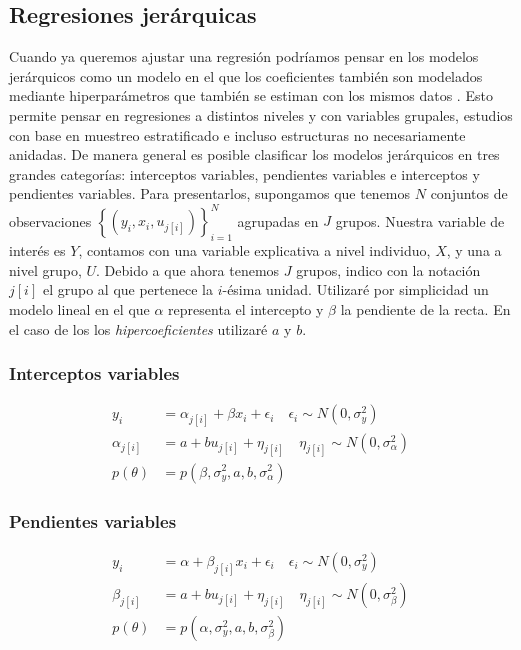 \subsection{Regresiones jerárquicas}

Cuando ya queremos ajustar una regresión podríamos pensar en los modelos jerárquicos como un modelo en el que los coeficientes también son modelados mediante hiperparámetros que también se estiman con los mismos datos \parencite[1]{GelmanHill06}. Esto permite pensar en regresiones a distintos niveles y con variables grupales, estudios con base en muestreo estratificado e incluso estructuras no necesariamente anidadas. De manera general es posible clasificar los modelos jerárquicos en tres grandes categorías: interceptos variables, pendientes variables e interceptos y pendientes variables. Para presentarlos, supongamos que tenemos $N$ conjuntos de observaciones $\left\lbrace(y_i,x_i,u_{j[i]})\right\rbrace_{i=1}^{N}$ agrupadas en $J$ grupos. Nuestra variable de interés es $Y$, contamos con una variable explicativa a nivel individuo, $X$,  y una a nivel grupo,  $U$.  Debido a que ahora tenemos $J$ grupos, indico con la notación $j[i]$ el grupo al que pertenece la $i$-ésima unidad. Utilizaré  por simplicidad un modelo lineal en el que $\alpha$ representa el intercepto y $\beta$ la pendiente de la recta. En el caso de los los \textit{hipercoeficientes} utilizaré $a$ y $b$. 

\subsubsection*{Interceptos variables}
\begin{align*}
y_i &= \alpha_{j[i]} + \beta x_i + \epsilon_i  \quad \epsilon_i  \sim N(0,\sigma_y^2) \\
\alpha_{j[i]} &= a + b u_{j[i]} + \eta_{j[i]} \quad \eta_{j[i]} \sim N(0, \sigma_{\alpha}^2) \\ 
p(\theta) &= p(\beta,\sigma_y^2,a,b,\sigma_{\alpha}^2)
\end{align*}

\subsubsection*{Pendientes variables}
\begin{align*}
y_i &= \alpha + \beta_{j[i]} x_i + \epsilon_i  \quad \epsilon_i  \sim N(0,\sigma_y^2) \\
\beta_{j[i]} &= a + b u_{j[i]} + \eta_{j[i]} \quad \eta_{j[i]} \sim N(0, \sigma_{\beta}^2) \\ 
p(\theta) &= p(\alpha,\sigma_y^2,a,b,\sigma_{\beta}^2)
\end{align*}

